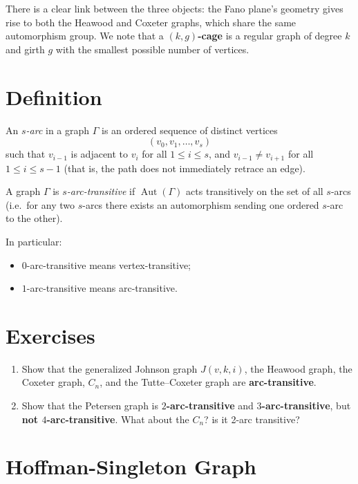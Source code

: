 \documentclass[12pt,a4paper,openany]{book}
\begin{document}
 \noindent There  is a clear link between the three objects: the Fano plane's geometry gives rise to both the Heawood and Coxeter graphs, which share the same automorphism group. We note that a \textbf{$(k, g)$-cage} is a regular graph of degree $k$ and girth $g$ with the smallest possible number of vertices.
 
 
 \section*{Definition}

An \emph{$s$-arc} in a graph $\Gamma$ is an ordered sequence of distinct vertices
\[
(v_0, v_1, \dots, v_s)
\]
such that $v_{i-1}$ is adjacent to $v_i$ for all $1 \le i \le s$, and $v_{i-1} \ne v_{i+1}$ for all $1 \le i \le s-1$ (that is, the path does not immediately retrace an edge).

A graph $\Gamma$ is \emph{$s$-arc-transitive} if $\operatorname{Aut}(\Gamma)$ acts transitively on the set of all $s$-arcs (i.e.\ for any two $s$-arcs there exists an automorphism sending one ordered $s$-arc to the other).

In particular:
\begin{itemize}
    \item $0$-arc-transitive means vertex-transitive;
    \item $1$-arc-transitive means arc-transitive.
\end{itemize}

\section*{Exercises}

\begin{enumerate}
    \item Show that the generalized Johnson graph $J(v,k,i)$, the Heawood graph, the Coxeter graph, $C_n$, and the Tutte--Coxeter graph are \textbf{arc-transitive}.
    
    \item Show that the Petersen graph is \textbf{$2$-arc-transitive} and \textbf{$3$-arc-transitive}, but \textbf{not $4$-arc-transitive}. What about the $C_n$? is it 2-arc transitive?
\end{enumerate}

\bigskip
 
  
\section{ Hoffman-Singleton Graph}
\end{document}
